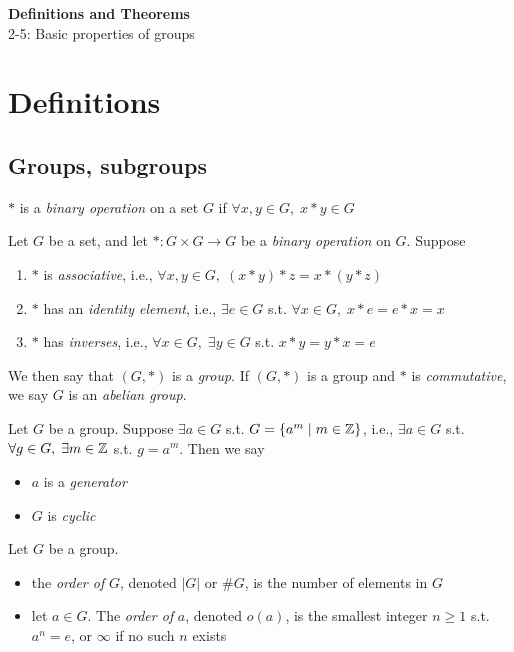 \noindent
\textbf{\LARGE Definitions and Theorems} \\
\large 2-5: Basic properties of groups

\newcommand{\congmod}[3]{
        #1 \equiv #2 \text{ (mod } #3)
    }

\normalsize

\section*{Definitions}

\subsection*{Groups, subgroups}

 $\ast$ is a \textit{binary operation} on a set $G$ if $\forall x, y \in G,\; x \ast y \in G$

 Let $G$ be a set, and let $\ast: G \times G \rightarrow G$ be a \textit{binary operation} on $G$. Suppose
\begin{enumerate}
    \item $\ast$ is \textit{associative}, i.e., $\forall x, y \in G, \; (x \ast y) \ast z = x \ast (y \ast z)$
    \item $\ast$ has an \textit{identity element}, i.e., $\exists e \in G$ s.t. $\forall x \in G, \; x \ast e = e \ast x = x$
    \item $\ast$ has \textit{inverses}, i.e., $\forall x \in G, \; \exists y \in G $ s.t. $x \ast y = y \ast x = e$
\end{enumerate}
We then say that $(G, \ast)$ is a \textit{group}.
If $(G, \ast)$ is a group and $\ast$ is \textit{commutative}, we say $G$ is an \textit{abelian group}.

 Let $G$ be a group. Suppose $\exists a \in G$ s.t. $G = \{a^m \mid m \in \mathbb{Z}\}$, i.e., $\exists a \in G$ s.t. $\forall g \in G, \; \exists m \in \mathbb{Z} $ s.t. $g = a^m$. 
Then we say 
\begin{itemize}
    \item $a$ is a \textit{generator}
    \item $G$ is \textit{cyclic}
\end{itemize}

 Let $G$ be a group. 
\begin{itemize}
    \item the \textit{order of} $G$, denoted $|G|$ or $\#G$, is the number of elements in $G$ 
    \item let $a \in G$. The \textit{order of} $a$, denoted $o(a)$, is the smallest integer $n \ge 1$ s.t. $a^n = e$, or $\infty$ if no such $n$ exists
\end{itemize}

